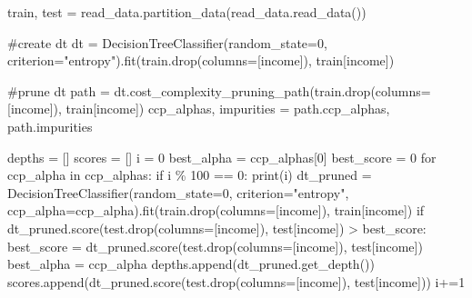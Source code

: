 \documentclass[
  letterpaper,
  DIV=11,
  numbers=noendperiod]{scrartcl}
\newenvironment{Shaded}{\begin{snugshade}}{\end{snugshade}}
\newcommand{\BuiltInTok}[1]{\textcolor[rgb]{0.00,0.23,0.31}{#1}}
\newcommand{\CommentTok}[1]{\textcolor[rgb]{0.37,0.37,0.37}{#1}}
\newcommand{\ControlFlowTok}[1]{\textcolor[rgb]{0.00,0.23,0.31}{#1}}
\newcommand{\DecValTok}[1]{\textcolor[rgb]{0.68,0.00,0.00}{#1}}
\newcommand{\KeywordTok}[1]{\textcolor[rgb]{0.00,0.23,0.31}{#1}}
\newcommand{\NormalTok}[1]{\textcolor[rgb]{0.00,0.23,0.31}{#1}}
\newcommand{\OperatorTok}[1]{\textcolor[rgb]{0.37,0.37,0.37}{#1}}
\newcommand{\StringTok}[1]{\textcolor[rgb]{0.13,0.47,0.30}{#1}}
\begin{document}
\begin{Shaded}
\begin{Highlighting}[]


\NormalTok{train, test }\OperatorTok{=}\NormalTok{ read\_data.partition\_data(read\_data.read\_data())}


\CommentTok{\#create dt}
\NormalTok{dt }\OperatorTok{=}\NormalTok{ DecisionTreeClassifier(random\_state}\OperatorTok{=}\DecValTok{0}\NormalTok{, criterion}\OperatorTok{=}\StringTok{"entropy"}\NormalTok{).fit(train.drop(columns}\OperatorTok{=}\NormalTok{[}\StringTok{\textquotesingle{}income\textquotesingle{}}\NormalTok{]), train[}\StringTok{\textquotesingle{}income\textquotesingle{}}\NormalTok{])}

\CommentTok{\#prune dt}
\NormalTok{path }\OperatorTok{=}\NormalTok{ dt.cost\_complexity\_pruning\_path(train.drop(columns}\OperatorTok{=}\NormalTok{[}\StringTok{\textquotesingle{}income\textquotesingle{}}\NormalTok{]), train[}\StringTok{\textquotesingle{}income\textquotesingle{}}\NormalTok{])}
\NormalTok{ccp\_alphas, impurities }\OperatorTok{=}\NormalTok{ path.ccp\_alphas, path.impurities}

\NormalTok{depths }\OperatorTok{=}\NormalTok{ []}
\NormalTok{scores }\OperatorTok{=}\NormalTok{ []}
\NormalTok{i }\OperatorTok{=} \DecValTok{0}
\NormalTok{best\_alpha }\OperatorTok{=}\NormalTok{ ccp\_alphas[}\DecValTok{0}\NormalTok{]}
\NormalTok{best\_score }\OperatorTok{=} \DecValTok{0}
\ControlFlowTok{for}\NormalTok{ ccp\_alpha }\KeywordTok{in}\NormalTok{ ccp\_alphas:}
    \ControlFlowTok{if}\NormalTok{ i }\OperatorTok{\%} \DecValTok{100} \OperatorTok{==} \DecValTok{0}\NormalTok{:}
        \BuiltInTok{print}\NormalTok{(i)}
\NormalTok{    dt\_pruned }\OperatorTok{=}\NormalTok{ DecisionTreeClassifier(random\_state}\OperatorTok{=}\DecValTok{0}\NormalTok{, criterion}\OperatorTok{=}\StringTok{"entropy"}\NormalTok{, ccp\_alpha}\OperatorTok{=}\NormalTok{ccp\_alpha).fit(train.drop(columns}\OperatorTok{=}\NormalTok{[}\StringTok{\textquotesingle{}income\textquotesingle{}}\NormalTok{]), train[}\StringTok{\textquotesingle{}income\textquotesingle{}}\NormalTok{])}
    \ControlFlowTok{if}\NormalTok{ dt\_pruned.score(test.drop(columns}\OperatorTok{=}\NormalTok{[}\StringTok{\textquotesingle{}income\textquotesingle{}}\NormalTok{]), test[}\StringTok{\textquotesingle{}income\textquotesingle{}}\NormalTok{]) }\OperatorTok{\textgreater{}}\NormalTok{ best\_score:}
\NormalTok{            best\_score }\OperatorTok{=}\NormalTok{ dt\_pruned.score(test.drop(columns}\OperatorTok{=}\NormalTok{[}\StringTok{\textquotesingle{}income\textquotesingle{}}\NormalTok{]), test[}\StringTok{\textquotesingle{}income\textquotesingle{}}\NormalTok{])}
\NormalTok{            best\_alpha }\OperatorTok{=}\NormalTok{ ccp\_alpha}
\NormalTok{    depths.append(dt\_pruned.get\_depth())}
\NormalTok{    scores.append(dt\_pruned.score(test.drop(columns}\OperatorTok{=}\NormalTok{[}\StringTok{\textquotesingle{}income\textquotesingle{}}\NormalTok{]), test[}\StringTok{\textquotesingle{}income\textquotesingle{}}\NormalTok{]))}
\NormalTok{    i}\OperatorTok{+=}\DecValTok{1}


\end{Highlighting}
\end{Shaded}
\end{document}
